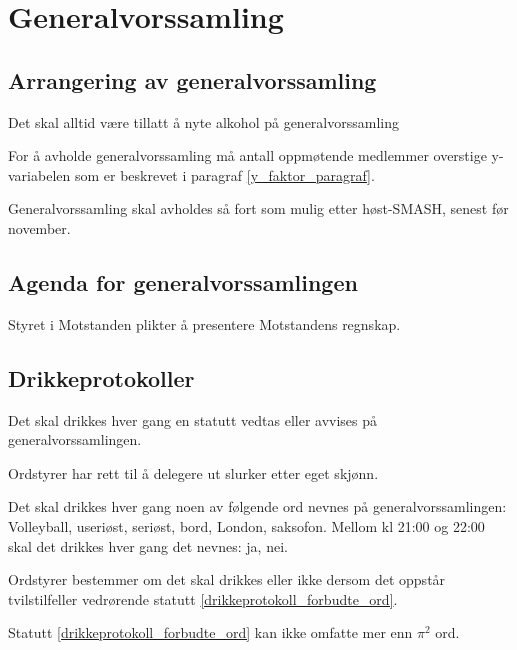   
\section{Generalvorssamling}
    \subsection{Arrangering av generalvorssamling}
        \begin{statute}
            Det skal alltid være tillatt å nyte alkohol på generalvorssamling
        \end{statute}
        \begin{statute} 
            For å avholde generalvorssamling må antall oppmøtende medlemmer overstige y-variabelen som er beskrevet i paragraf \ref{y_faktor_paragraf}.
        \end{statute}
        \begin{statute}
            Generalvorssamling skal avholdes så fort som mulig etter høst-SMASH, senest før november.
        \end{statute}
    
    \subsection{Agenda for generalvorssamlingen}
        \begin{statute}
            Styret i Motstanden plikter å presentere Motstandens regnskap. 
        \end{statute}

    \subsection{Drikkeprotokoller}
        \begin{statute}
            Det skal drikkes hver gang en statutt vedtas eller avvises på generalvorssamlingen.
        \end{statute}
        \begin{statute}
            Ordstyrer har rett til å delegere ut slurker etter eget skjønn.
        \end{statute}
        \begin{statute}[\label{drikkeprotokoll_forbudte_ord}]
            Det skal drikkes hver gang noen av følgende ord nevnes på generalvorssamlingen: Volleyball, useriøst, seriøst, bord, London, saksofon. Mellom kl 21:00 og 22:00 skal det drikkes hver gang det nevnes: ja, nei.
        \end{statute}
        \begin{statute}
            Ordstyrer bestemmer om det skal drikkes eller ikke dersom det oppstår tvilstilfeller vedrørende statutt \ref{drikkeprotokoll_forbudte_ord}.
        \end{statute}
        \begin{statute}
            Statutt \ref{drikkeprotokoll_forbudte_ord} kan ikke omfatte mer enn $\pi^2$ ord.
        \end{statute}
        

